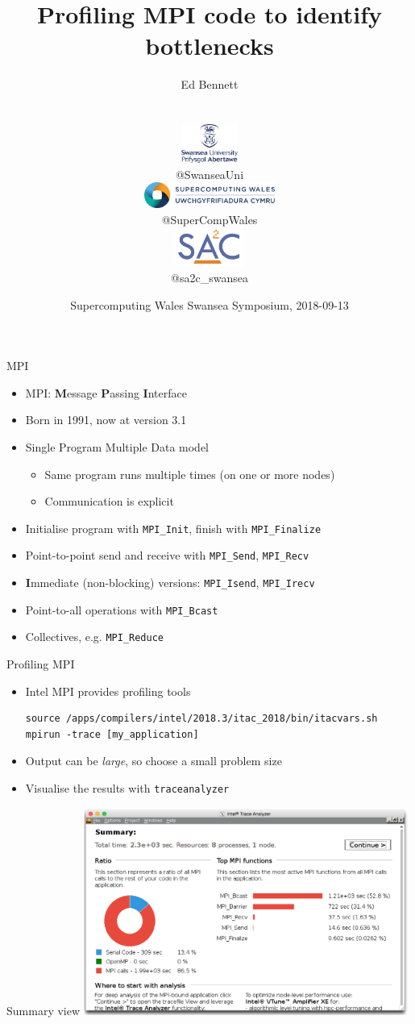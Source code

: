 \documentclass[handout]{beamer}
\title{Profiling MPI code to identify bottlenecks}
\author{{\large Ed Bennett}
	\\{\small@QuantumofEd}
	\\\vspace{16pt}
	\hfill
	\parbox{0.22\textwidth}{\centering\includegraphics[height=36pt]{logos/swansea}\\\small @SwanseaUni}
	\parbox{0.44\textwidth}{\centering\includegraphics[height=24pt]{logos/scw}\\\small @SuperCompWales}
	\parbox{0.22\textwidth}{\centering\includegraphics[height=36pt]{logos/sa2c}\\\small @sa2c\_swansea} }
\date{Supercomputing Wales Swansea Symposium, 2018-09-13}
\begin{document}
\frame{\titlepage}

\begin{frame}[fragile]{MPI}
	\begin{itemize}[<+->]
		\item MPI: \textbf{M}essage \textbf{P}assing \textbf{I}nterface
		\item Born in 1991, now at version 3.1
		\item Single Program Multiple Data model
		\begin{itemize}[<+->]
			\item Same program runs multiple times (on one or more nodes)
			\item Communication is explicit
		\end{itemize}
		\item Initialise program with \verb|MPI_Init|, finish with \verb|MPI_Finalize|
		\item Point-to-point send and receive with \verb|MPI_Send|, \verb|MPI_Recv|
		\item \textbf{I}mmediate (non-blocking) versions: \verb|MPI_Isend|, \verb|MPI_Irecv|
		\item Point-to-all operations with \verb|MPI_Bcast|
		\item Collectives, e.g. \verb|MPI_Reduce|
	\end{itemize}
\end{frame}

\begin{frame}[fragile]{Profiling MPI}
	\begin{itemize}[<+->]
		\item Intel MPI provides profiling tools
		\begin{verbatim}source /apps/compilers/intel/2018.3/itac_2018/bin/itacvars.sh
mpirun -trace [my_application]\end{verbatim}
		\item Output can be \emph{large}, so choose a small problem size
		\item Visualise the results with \verb|traceanalyzer|
	\end{itemize}
\end{frame}

\begin{frame}{Summary view}
	\centering
	\includegraphics[width=0.8\textwidth]{figs/first-overview}
\end{frame}
\end{document}
